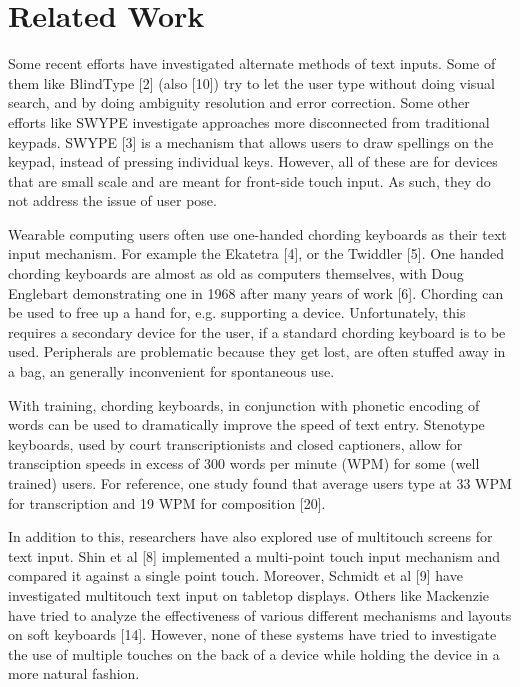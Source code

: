 \section{Related Work}

Some recent efforts have investigated alternate methods of text
inputs. Some of them like BlindType [2] (also [10]) try to let the
user type without doing visual search, and by doing ambiguity
resolution and error correction. Some other efforts like SWYPE
investigate approaches more disconnected from traditional
keypads. SWYPE [3] is a mechanism that allows users to draw spellings
on the keypad, instead of pressing individual keys. However, all of
these are for devices that are small scale and are meant for
front-side touch input.  As such, they do not address the issue of
user pose.

Wearable computing users often use one-handed chording keyboards as
their text input mechanism.  For example the Ekatetra [4], or the Twiddler [5].  One handed chording keyboards are almost
as old as computers themselves, with Doug Englebart demonstrating one
in 1968 after many years of work [6]. Chording can be
used to free up a hand for, e.g. supporting a device.  Unfortunately,
this requires a secondary device for the user, if a standard chording
keyboard is to be used.  Peripherals are problematic because they get
lost, are often stuffed away in a bag, an generally inconvenient for
spontaneous use.

With training, chording keyboards, in conjunction with phonetic
encoding of words can be used to dramatically improve the speed of
text entry.  Stenotype keyboards, used by court transcriptionists and
closed captioners, allow for transciption speeds in excess of 300
words per minute (WPM) for some (well trained) users.  For reference,
one study found that average users type at 33 WPM for transcription
and 19 WPM for composition [20].

In addition to this, researchers have also explored use of multitouch
screens for text input. Shin et al [8] implemented a multi-point touch
input mechanism and compared it against a single point
touch. Moreover, Schmidt et al [9] have investigated multitouch text
input on tabletop displays. Others like Mackenzie have tried to
analyze the effectiveness of various different mechanisms and layouts
on soft keyboards [14]. However, none of these systems have
tried to investigate the use of multiple touches on the back of a
device while holding the device in a more natural fashion.
